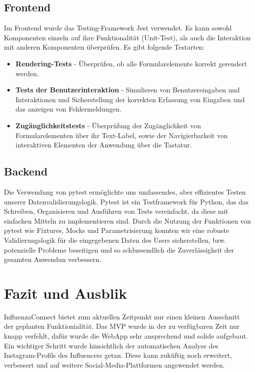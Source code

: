 \documentclass[conference,a4paper,flushend]{cs-techrep}
\begin{document}
\subsection{Frontend}
Im Frontend wurde das Testing-Framework Jest verwendet. Es kann sowohl Komponenten einzeln auf ihre Funktionalität (Unit-Test), als auch die Interaktion mit anderen Komponenten überprüfen. Es gibt folgende Testarten:

\begin{itemize}
	\item{\textbf{Rendering-Tests} - Überprüfen, ob alle Formularelemente korrekt gerendert werden.}
	\item{\textbf{Tests der Benutzerinteraktion} - Simulieren von Benutzereingaben und Interaktionen und Sicherstellung der korrekten Erfassung von Eingaben und das anzeigen von Fehlermeldungen.}
	\item{\textbf{Zugänglichkeitstests} - Überprüfung der Zugänglichkeit von Formularelementen über ihr Text-Label, sowie der Navigierbarkeit von interaktiven Elementen der Anwendung über die Tastatur.}
\end{itemize}


\subsection{Backend}
Die Verwendung von pytest ermöglichte uns umfassendes, aber effizientes Testen unserer Datenvalidierungslogik. Pytest ist ein Testframework für Python, das das Schreiben, Organisieren und Ausführen von Tests vereinfacht, da diese mit einfachen Mitteln zu implementieren sind. Durch die Nutzung der Funktionen von pytest wie Fixtures, Mocks und Parametrisierung konnten wir eine robuste Validierungslogik für die eingegebenen Daten des Users sicherstellen, bzw. potenzielle Probleme beseitigen und so schlussendlich die Zuverlässigkeit der gesamten Anwendun verbessern. 



\section{Fazit und Ausblik}
InfluenzaConnect bietet zum aktuellen Zeitpunkt nur einen kleinen Ausschnitt der geplanten Funktionialität. Das MVP wurde in der zu verfügbaren Zeit nur knapp verfehlt, dafür wurde die WebApp sehr ansprechend und solide aufgebaut. Ein wichtiger Schritt wurde hinsichtlich der automatischen Analyse des Instagram-Profils des Influencers getan. Diese kann zuküftig noch erweitert, verbessert und auf weitere Social-Media-Plattformen angewendet werden. 
\end{document}
